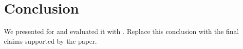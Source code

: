 \section{Conclusion}
We presented  for  and evaluated it with . Replace this conclusion with the final claims supported by the paper.
